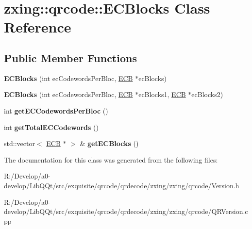\hypertarget{classzxing_1_1qrcode_1_1_e_c_blocks}{}\section{zxing\+:\+:qrcode\+:\+:E\+C\+Blocks Class Reference}
\label{classzxing_1_1qrcode_1_1_e_c_blocks}
\subsection*{Public Member Functions}
\begin{DoxyCompactItemize}
\item 
\mbox{\label{classzxing_1_1qrcode_1_1_e_c_blocks_af0e21bc8a5cb4436a8853b10a2c02c2d}} 
{\bfseries E\+C\+Blocks} (int ec\+Codewords\+Per\+Bloc, \mbox{\hyperlink{classzxing_1_1qrcode_1_1_e_c_b}{E\+CB}} $\ast$ec\+Blocks)
\item 
\mbox{\label{classzxing_1_1qrcode_1_1_e_c_blocks_a78c68f6e6068f1484a5a3be837df30b3}} 
{\bfseries E\+C\+Blocks} (int ec\+Codewords\+Per\+Bloc, \mbox{\hyperlink{classzxing_1_1qrcode_1_1_e_c_b}{E\+CB}} $\ast$ec\+Blocks1, \mbox{\hyperlink{classzxing_1_1qrcode_1_1_e_c_b}{E\+CB}} $\ast$ec\+Blocks2)
\item 
\mbox{\label{classzxing_1_1qrcode_1_1_e_c_blocks_af38f0b50f818b91263516551f98bd8a3}} 
int {\bfseries get\+E\+C\+Codewords\+Per\+Bloc} ()
\item 
\mbox{\label{classzxing_1_1qrcode_1_1_e_c_blocks_a5b016bd9ccba815783b7f44bd4e9aba3}} 
int {\bfseries get\+Total\+E\+C\+Codewords} ()
\item 
\mbox{\label{classzxing_1_1qrcode_1_1_e_c_blocks_a5c1c28471a6709331cfbff045d3b8d7c}} 
std\+::vector$<$ \mbox{\hyperlink{classzxing_1_1qrcode_1_1_e_c_b}{E\+CB}} $\ast$ $>$ \& {\bfseries get\+E\+C\+Blocks} ()
\end{DoxyCompactItemize}


The documentation for this class was generated from the following files\+:\begin{DoxyCompactItemize}
\item 
R\+:/\+Develop/a0-\/develop/\+Lib\+Q\+Qt/src/exquisite/qrcode/qrdecode/zxing/zxing/qrcode/Version.\+h\item 
R\+:/\+Develop/a0-\/develop/\+Lib\+Q\+Qt/src/exquisite/qrcode/qrdecode/zxing/zxing/qrcode/Q\+R\+Version.\+cpp\end{DoxyCompactItemize}

